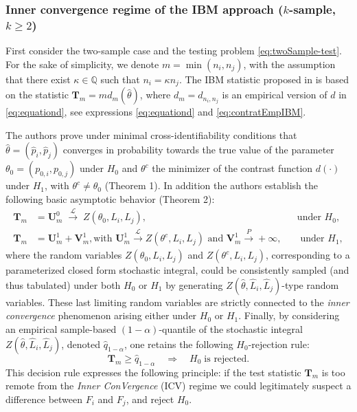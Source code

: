\subsubsection{\texorpdfstring{Inner convergence regime of the IBM approach (\(k\)-sample, \(k \geq 2\))}{Inner convergence regime of the IBM approach (k-sample, k \textbackslash geq 2)}}\label{inner-convergence-regime-of-the-ibm-approach-k-sample-k-geq-2}

First consider the two-sample case and the testing problem \eqref{eq:twoSample-test}. For the sake of simplicity, we denote \(m = \min(n_i,n_j)\), with the assumption that there exist \(\kappa\in \mathbb Q\) such that \(n_i=\kappa n_j\). The IBM statistic proposed in \citet{Milhaud+Pommeret+Salhi+Vandekerkhove:2023} is based on the statistic \(\mathbf{T}_m = m d_m(\hat \theta)\), where
\(d_m=d_{n_i,n_j}\) is an empirical version of \(d\) in \eqref{eq:equationd}, see expressions \eqref{eq:equationd} and \eqref{eq:contratEmpIBM}.

The authors prove under minimal cross-identifiability conditions \citep[see Section 3 of][]{Milhaud+Pommeret+Salhi+Vandekerkhove:2023} that \(\hat \theta=(\hat p_i,\hat p_j)\) converges in probability towards the true value of the parameter \(\theta_0=(p_{0,i},p_{0,j})\) under \(H_0\) and \(\theta^c\) the minimizer of the contrast function \(d(\cdot)\) under \(H_1\), with \(\theta^c\neq \theta_0\) (Theorem 1).
In addition the authors establish the following basic asymptotic behavior (Theorem 2):
\[
  \begin{aligned}
  \mathbf{T}_m &= \mathbf{U}_m^0 \;\stackrel{\mathcal{L}}{\rightarrow}\; Z(\theta_0,L_i,L_j), && \text{under } H_0, \\
  \mathbf{T}_m &= \mathbf{U}_m^1 + \mathbf{V}^1_m, \text{with } \mathbf{U}^1_m \stackrel{\mathcal{L}}{\rightarrow} Z(\theta^c,L_i,L_j) \text{ and } \mathbf{V}^1_m \stackrel{P}{\rightarrow} +\infty, && \text{ under } H_1,
  \end{aligned}
\]
where the random variables \(Z(\theta_0,L_i,L_j)\) and \(Z(\theta^c,L_i,L_j)\), corresponding to a parameterized closed form stochastic integral, could be consistently sampled (and thus tabulated) under both \(H_0\) or \(H_1\) by generating \(Z(\hat \theta,\hat L_i,\hat L_j)\)-type random variables. These last limiting random variables are strictly connected to the \emph{inner convergence} phenomenon arising either under \(H_0\) or \(H_1\). Finally, by considering an empirical sample-based \((1-\alpha)\)-quantile of the stochastic integral \(Z(\hat \theta,\hat L_i,\hat L_j)\), denoted \(\hat q_{1-\alpha}\), one retains the following \(H_0\)-rejection rule:
\begin{equation}
    \mathbf{T}_m \geq \hat q_{1-\alpha} \quad \Rightarrow \quad H_0 \;  \text{is rejected}.
\label{eq:testingProcedure}
\end{equation}
This decision rule expresses the following principle: if the test statistic \(\mathbf{T}_m\) is too remote from the \emph{Inner ConVergence} (ICV) regime we could legitimately suspect a difference between \(F_i\) and \(F_j\), and reject \(H_0\).

